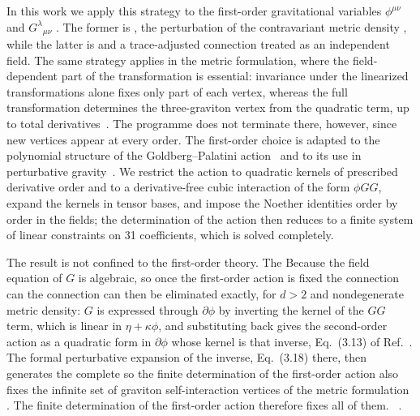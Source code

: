 \documentclass[prd,aps,preprint,superscriptaddress,nofootinbib,amsmath,amssymb,eqsecnum]{revtex4-2}
\providecommand{\DIFaddtex}[1]{{\protect\color{blue} \sf #1}} %
\providecommand{\DIFdeltex}[1]{{\protect\color{red} \scriptsize #1}} %
\providecommand{\DIFaddbegin}{} %
\providecommand{\DIFaddend}{} %
\providecommand{\DIFdelbegin}{} %
\providecommand{\DIFdelend}{} %
\providecommand{\DIFadd}[1]{\texorpdfstring{\DIFaddtex{#1}}{#1}} %
\providecommand{\DIFdel}[1]{\texorpdfstring{\DIFdeltex{#1}}{}} %
\begin{document}
In this work we apply this strategy to the first-order gravitational variables $\phi^{\mu\nu}$
and $G^{\lambda}{}_{\mu\nu}$\DIFdelbegin \DIFdel{. The former is }\DIFdelend \DIFaddbegin \DIFadd{, }\DIFaddend the perturbation of the contravariant metric density \DIFdelbegin \DIFdel{, while the latter is }\DIFdelend \DIFaddbegin \DIFadd{and }\DIFaddend a
trace-adjusted connection treated as an independent field. The
same strategy applies in the metric formulation, where the field-dependent part of the
transformation is essential: invariance under the linearized transformations alone fixes
only part of each vertex, whereas the full transformation determines the three-graviton
vertex from the quadratic term, up to total derivatives~\cite{BrandtFrenkel1996}. The
programme does not terminate there, however, since new vertices appear at every order. The
first-order choice is adapted to the polynomial structure of the Goldberg--Palatini
action~\cite{Goldberg1958,Palatini1919,Ferraris1982} and to its use in perturbative
gravity~\cite{BrandtMcKeon2016}. We restrict the action to quadratic kernels of
prescribed derivative order and to a derivative-free cubic interaction of the form $\phi GG$,
expand the kernels in tensor bases, and impose the Noether identities order by order in the
fields; the determination of the action then reduces to a finite system of linear constraints on 31
coefficients, which is solved completely. \DIFdelbegin %

\DIFdel{The result is not confined to the first-order theory. The }\DIFdelend \DIFaddbegin \DIFadd{Because the }\DIFaddend field equation of $G$ is algebraic, \DIFdelbegin \DIFdel{so once the
first-order action is fixed the connection can }\DIFdelend \DIFaddbegin \DIFadd{the
connection can then }\DIFaddend be eliminated exactly, \DIFdelbegin \DIFdel{for $d>2$ and nondegenerate metric density: $G$ is expressed through
$\partial\phi$ by inverting the kernel of the $GG$ term, which is linear in
$\eta+\kappa\phi$, and substituting back gives the second-order action as a quadratic form
in $\partial\phi$ whose kernel is that inverse, Eq.~(3.13) of Ref.~\cite{BrandtMcKeon2016}.
The formal perturbative expansion of the inverse, Eq.~(3.18) there,
then generates the complete }\DIFdelend \DIFaddbegin \DIFadd{so the finite determination of the first-order
action also fixes the }\DIFaddend infinite set of graviton \DIFdelbegin \DIFdel{self-interaction }\DIFdelend vertices of the metric
formulation\DIFdelbegin \DIFdel{. The finite determination of the first-order action therefore fixes all of them.
}\DIFdelend \DIFaddbegin \DIFadd{~\cite{BrandtMcKeon2016}.
}\DIFaddend 
\end{document}
